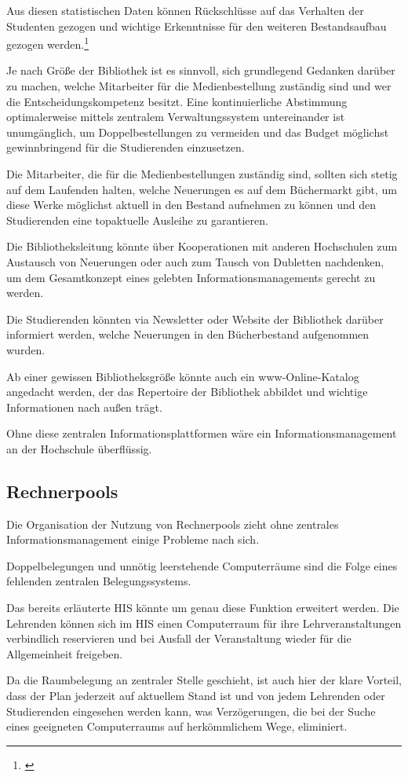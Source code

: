 Aus diesen statistischen Daten können Rückschlüsse auf das Verhalten der Studenten gezogen und wichtige Erkenntnisse für den weiteren Bestandsaufbau gezogen werden.\footnote{\cite{merkle_aufbau_2004}}

Je nach Größe der Bibliothek ist es sinnvoll, sich grundlegend Gedanken darüber zu machen, welche Mitarbeiter für die Medienbestellung zuständig sind und wer die Entscheidungskompetenz besitzt. 
Eine kontinuierliche Abstimmung optimalerweise mittels zentralem Verwaltungssystem untereinander ist unumgänglich, um Doppelbestellungen zu vermeiden und das Budget möglichst gewinnbringend für die Studierenden einzusetzen.

Die Mitarbeiter, die für die Medienbestellungen zuständig sind, sollten sich stetig auf dem Laufenden halten, welche Neuerungen es auf dem Büchermarkt gibt, um diese Werke möglichst aktuell in den Bestand aufnehmen zu können und den Studierenden eine topaktuelle Ausleihe zu garantieren.

Die Bibliotheksleitung könnte über Kooperationen mit anderen Hochschulen zum Austausch von Neuerungen oder auch zum Tausch von Dubletten nachdenken, um dem Gesamtkonzept eines gelebten Informationsmanagements gerecht zu werden.

Die Studierenden könnten via Newsletter oder Website der Bibliothek darüber informiert werden, welche Neuerungen in den Bücherbestand aufgenommen wurden. 

Ab einer gewissen Bibliotheksgröße könnte auch ein www-Online-Katalog angedacht werden, der das Repertoire der Bibliothek abbildet und wichtige Informationen nach außen trägt.

Ohne diese zentralen Informationsplattformen wäre ein Informationsmanagement an der Hochschule überflüssig.


\subsection{Rechnerpools}
Die Organisation der Nutzung von Rechnerpools zieht ohne zentrales Informationsmanagement einige Probleme nach sich.

Doppelbelegungen und unnötig leerstehende Computerräume sind die Folge eines fehlenden zentralen Belegungssystems.

Das bereits erläuterte HIS könnte um genau diese Funktion erweitert werden. 
Die Lehrenden können sich im HIS einen Computerraum für ihre Lehrveranstaltungen verbindlich reservieren und bei Ausfall der Veranstaltung wieder für die Allgemeinheit freigeben.

Da die Raumbelegung an zentraler Stelle geschieht, ist auch hier der klare Vorteil, dass der Plan jederzeit auf aktuellem Stand ist und von jedem Lehrenden oder Studierenden eingesehen werden kann, was Verzögerungen, die bei der Suche eines geeigneten Computerraums auf herkömmlichem Wege, eliminiert. 
